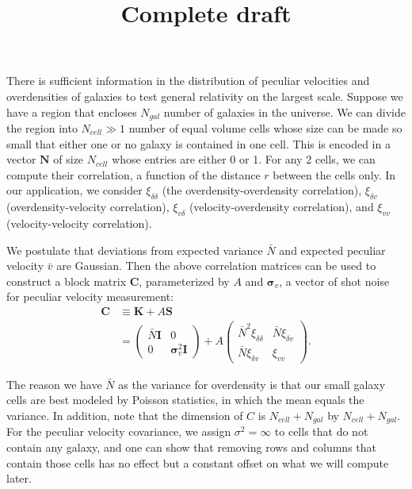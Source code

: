 \documentclass{article}
\title{Complete draft}
\begin{document}
\maketitle

There is sufficient information in the distribution of peculiar velocities and overdensities of galaxies to test general relativity on the largest scale. Suppose we have a region that encloses $N_{gal}$ number of galaxies in the universe. We can divide the region into $N_{cell}\gg 1$ number of equal volume cells whose size can be made so small that either one or no galaxy is contained in one cell. This is encoded in a vector $\textbf{N}$ of size $N_{cell}$ whose entries are either 0 or 1. For any 2 cells, we can compute their correlation, a function of the distance $r$ between the cells only. In our application, we consider $\xi_{\delta\delta}$ (the overdensity-overdensity correlation), $\xi_{\delta v}$ (overdensity-velocity correlation), $\xi_{v\delta}$ (velocity-overdensity correlation), and $\xi_{vv}$ (velocity-velocity correlation).\par
We postulate that deviations from expected variance $\bar{N}$ and expected peculiar velocity $\bar{v}$ are Gaussian. Then the above correlation matrices can be used to construct a block matrix $\textbf{C}$, parameterized by $A$ and $\bm{\sigma}_v$, a vector of shot noise for peculiar velocity measurement:
\begin{align}
\textbf{C} &\equiv \textbf{K} + A\textbf{S} \\ 
&=
\left(
\begin{array}{cc}
\bar{N}\textbf{I} & 0 \nonumber \\
0 & \bm{\sigma}_v^2\textbf{I}
\end{array}
\right)
+
A
\left(
\begin{array}{cc}
\bar{N}^2\xi_{\delta\delta} & \bar{N}\xi_{\delta v} \\
\bar{N}\xi_{\delta v} & \xi_{vv}
\end{array}
\right).
\end{align}\par
The reason we have $\bar{N}$ as the variance for overdensity is that our small galaxy cells are best modeled by Poisson statistics, in which the mean equals the variance. In addition, note that the dimension of $C$ is $N_{cell}+N_{gal}$ by $N_{cell}+N_{gal}$. For the peculiar velocity covariance, we assign $\sigma^2=\infty$ to cells that do not contain any galaxy, and one can show that removing rows and columns that contain those cells has no effect but a constant offset on what we will compute later. \par
\end{document}
